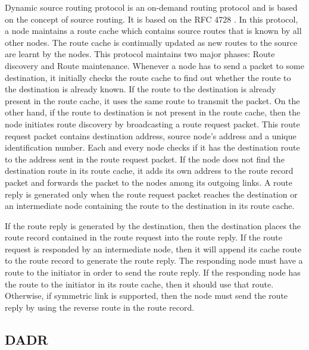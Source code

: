 \documentclass[11pt,draftclsnofoot,onecolumn]{IEEEtran}
\begin{document}
Dynamic source routing protocol is an on-demand routing protocol and is based on the concept of source routing. It is based on the RFC 4728 \cite{Johnson2007} . In this protocol, a node maintains a route cache which contains source routes that is known by all other nodes. The route cache is continually updated as new routes to the source are learnt by the nodes. This protocol maintains two major phases: Route discovery and Route maintenance. Whenever a node has to send a packet to some destination, it initially checks the route cache to find out whether the route to the destination is already known. If the route to the destination is already present in the route cache, it uses the same route to transmit the packet. On the other hand, if the route to destination is not present in the route cache, then the node initiates route discovery by broadcasting a route request packet. This route request packet contains destination address, source node’s address and a unique identification number. Each and every node checks if it has the destination route to the address sent in the route request packet. If the node does not find the destination route in its route cache, it adds its own address to the route record packet and forwards the packet to the nodes among its outgoing links. A route reply is generated only when the route request packet reaches the destination or an intermediate node containing the route to the destination in its route cache. 
	
If the route reply is generated by the destination, then the destination places the route record contained in the route request into the route reply. If the route request is responded by an intermediate node, then it will append its cache route to the route record to generate the route reply. The responding node must have a route to the initiator in order to send the route reply. If the responding node has the route to the initiator in its route cache, then it should use that route. Otherwise, if symmetric link is supported, then the node must send the route reply by using the reverse route in the route record. 

\subsection{DADR}\label{dadr}
\end{document}
